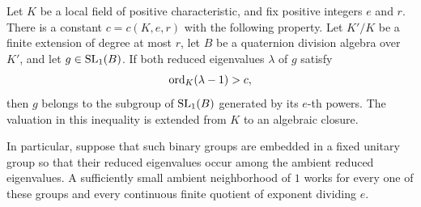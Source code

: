 \begin{lemma}\label{ind:binary-smallness}
Let $K$ be a local field of positive characteristic, and fix positive
integers $e$ and $r$.  There is a constant $c=c(K,e,r)$ with the following
property.  Let $K'/K$ be a finite extension of degree at most $r$, let
$B$ be a quaternion division algebra over $K'$, and let
$g\in\operatorname{SL}_1(B)$.  If both reduced eigenvalues $\lambda$ of $g$ satisfy
\[
                         \operatorname{ord}_K(\lambda-1)>c,
\]
then $g$ belongs to the subgroup of $\operatorname{SL}_1(B)$ generated by its $e$-th
powers.  The valuation in this inequality is extended from $K$ to an
algebraic closure.

In particular, suppose that such binary groups are embedded in a fixed
unitary group so that their reduced eigenvalues occur among the ambient
reduced eigenvalues.  A sufficiently small ambient neighborhood of $1$
works for every one of these groups and every continuous finite quotient
of exponent dividing $e$.
\end{lemma}

